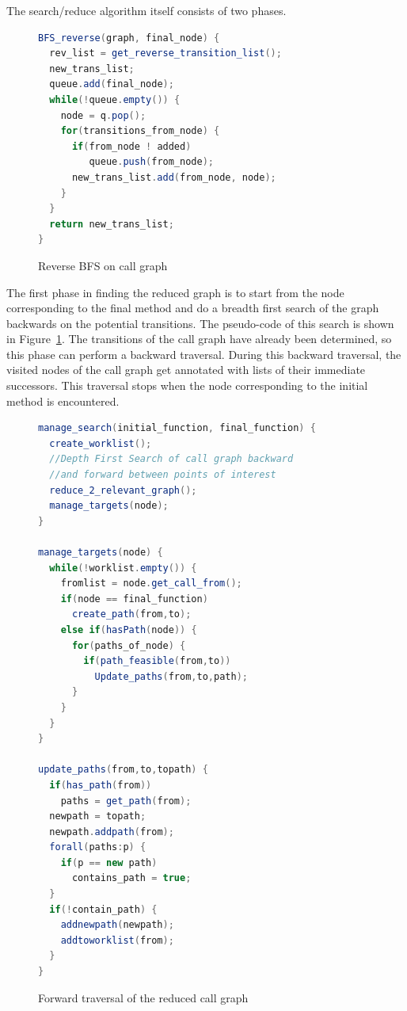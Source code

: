 \documentclass{acm_proc_article-sp}
\begin{document}
The search/reduce algorithm itself consists of two phases.

\begin{figure}[t!]
\begin{lstlisting}[language=Java]
BFS_reverse(graph, final_node) {
  rev_list = get_reverse_transition_list();
  new_trans_list;
  queue.add(final_node);
  while(!queue.empty()) {
    node = q.pop();
    for(transitions_from_node) {
      if(from_node ! added)
         queue.push(from_node);
      new_trans_list.add(from_node, node);
    }
  }
  return new_trans_list;
}
\end{lstlisting}
\vspace*{-0.1in}
\caption{\label{alg:compression}Reverse BFS on call graph}
\vspace*{-0.1in}
\end{figure}


The first phase in finding the reduced graph is to start from the node
corresponding to the final method and do a breadth first search of the
graph backwards on the potential transitions. The pseudo-code of this
search is shown in Figure~\ref{alg:compression}.  The transitions of the
call graph have already been determined, so this phase can perform a
backward traversal.  During this backward traversal, the visited nodes
of the call graph get annotated with lists of their immediate
successors.  This traversal stops when the node corresponding to the
initial method is encountered.

\begin{figure}[t!]
\begin{lstlisting}[language=Java]
manage_search(initial_function, final_function) {
  create_worklist();
  //Depth First Search of call graph backward
  //and forward between points of interest
  reduce_2_relevant_graph();
  manage_targets(node);
}

manage_targets(node) {
  while(!worklist.empty()) {
    fromlist = node.get_call_from();
    if(node == final_function)
      create_path(from,to);
    else if(hasPath(node)) {
      for(paths_of_node) {
        if(path_feasible(from,to))
          Update_paths(from,to,path);
      }
    }
  }
}

update_paths(from,to,topath) {
  if(has_path(from))
    paths = get_path(from);
  newpath = topath;
  newpath.addpath(from);
  forall(paths:p) {
    if(p == new path)
      contains_path = true;
  }
  if(!contain_path) {
    addnewpath(newpath);
    addtoworklist(from);
  }
}
\end{lstlisting}
\caption{\label{alg:paths}Forward traversal of the reduced call graph}
\end{figure}
\end{document}
